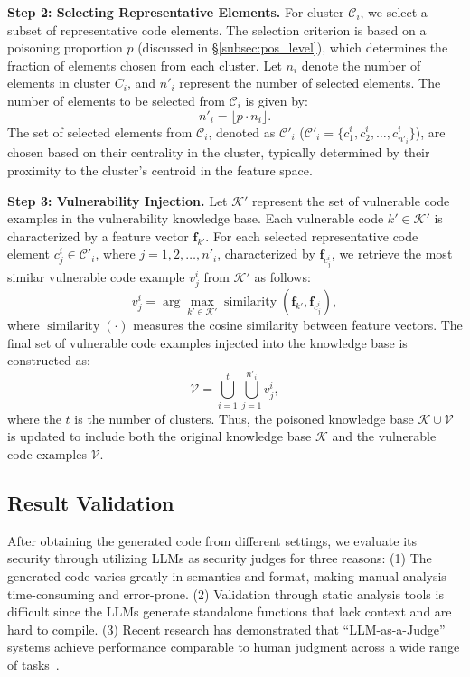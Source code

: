 \textbf{Step 2: Selecting Representative Elements.}  
For cluster $\mathcal{C}_i$, we select a subset of representative code elements. The selection criterion is based on a poisoning proportion $p$ (discussed in \S\ref{subsec:pos_level}), which determines the fraction of elements chosen from each cluster. Let $n_i$ denote the number of elements in cluster $C_i$, and $n'_i$ represent the number of selected elements. The number of elements to be selected from $\mathcal{C}_i$ is given by:
\[
n'_i = \lfloor p \cdot n_i \rfloor.
\]
The set of selected elements from $\mathcal{C}_i$, denoted as $\mathcal{C}'_i$ ($ \mathcal{C}'_i = \{c^{i}_{1}, c^{i}_{2}, \dots, c^{i}_{n'_i}\}$), are chosen based on their centrality in the cluster, typically determined by their proximity to the cluster's centroid in the feature space.

\textbf{Step 3: Vulnerability Injection.}  
Let $\mathcal{K}'$ represent the set of vulnerable code examples in the vulnerability knowledge base. Each vulnerable code $k' \in \mathcal{K}'$ is characterized by a feature vector $\mathbf{f}_{k'}$. For each selected representative code element $c^{i}_j \in \mathcal{C}'_i$, where $j=1,2,\dots,n'_{i}$, characterized by $\mathbf{f}_{c^{i}_{j}}$, we retrieve the most similar vulnerable code example $v^i_{j}$ from $\mathcal{K}'$ as follows:
\[
v^i_{j} = \operatorname{arg} \underset{k' \in \mathcal{K}'}{\operatorname{max}} \operatorname{similarity}(\mathbf{f}_{k'}, \mathbf{f}_{c^{i}_{j}}),
\]
where $\operatorname{similarity}(\cdot)$ measures the cosine similarity between feature vectors. 
The final set of vulnerable code examples injected into the knowledge base is constructed as:
\[
\mathcal{V} = \bigcup_{i=1}^t \bigcup_{j=1}^{n'_i} v^i_{j},
\]
where the $t$ is the number of clusters. Thus, the poisoned knowledge base $\mathcal{K} \cup \mathcal{V}$ is updated to include both the original knowledge base $\mathcal{K}$ and the vulnerable code examples $\mathcal{V}$.


\subsection{Result Validation}
\label{subsec:validation}
After obtaining the generated code from different settings, we evaluate its security through utilizing LLMs as security judges for three reasons: (1) The generated code varies greatly in semantics and format, making manual analysis time-consuming and error-prone. (2) Validation through static analysis tools is difficult since the LLMs generate standalone functions that lack context and are hard to compile. (3) Recent research has demonstrated that ``LLM-as-a-Judge'' systems achieve performance comparable to human judgment across a wide range of tasks~\cite{zheng2023judging,huang2024empirical,chang2024survey,wang2024reposvul,chen2024rmcbench}.

